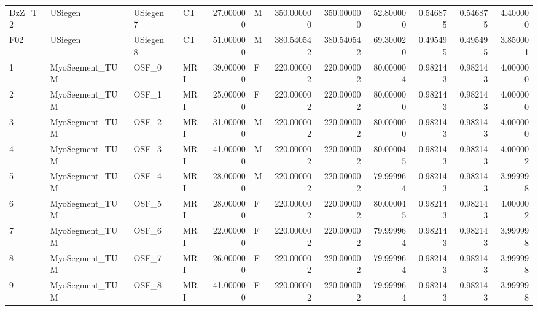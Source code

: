 \begin{tabular}{llllrlrrrrrr}
DzZ\_T2 &         USiegen &    USiegen\_7 &                 CT &  27.000000 &        M &       350.000000 &    350.000000 &   52.800000 &               0.546875 &            0.546875 &          4.400000 \\
F02    &         USiegen &    USiegen\_8 &                 CT &  51.000000 &        M &       380.540542 &    380.540542 &   69.300020 &               0.495495 &            0.495495 &          3.850001 \\
1      &  MyoSegment\_TUM &        OSF\_0 &                MRI &  39.000000 &        F &       220.000002 &    220.000002 &   80.000004 &               0.982143 &            0.982143 &          4.000000 \\
2      &  MyoSegment\_TUM &        OSF\_1 &                MRI &  25.000000 &        F &       220.000002 &    220.000002 &   80.000000 &               0.982143 &            0.982143 &          4.000000 \\
3      &  MyoSegment\_TUM &        OSF\_2 &                MRI &  31.000000 &        M &       220.000002 &    220.000002 &   80.000000 &               0.982143 &            0.982143 &          4.000000 \\
4      &  MyoSegment\_TUM &        OSF\_3 &                MRI &  41.000000 &        M &       220.000002 &    220.000002 &   80.000045 &               0.982143 &            0.982143 &          4.000002 \\
5      &  MyoSegment\_TUM &        OSF\_4 &                MRI &  28.000000 &        M &       220.000002 &    220.000002 &   79.999964 &               0.982143 &            0.982143 &          3.999998 \\
6      &  MyoSegment\_TUM &        OSF\_5 &                MRI &  28.000000 &        F &       220.000002 &    220.000002 &   80.000045 &               0.982143 &            0.982143 &          4.000002 \\
7      &  MyoSegment\_TUM &        OSF\_6 &                MRI &  22.000000 &        F &       220.000002 &    220.000002 &   79.999964 &               0.982143 &            0.982143 &          3.999998 \\
8      &  MyoSegment\_TUM &        OSF\_7 &                MRI &  26.000000 &        F &       220.000002 &    220.000002 &   79.999964 &               0.982143 &            0.982143 &          3.999998 \\
9      &  MyoSegment\_TUM &        OSF\_8 &                MRI &  41.000000 &        F &       220.000002 &    220.000002 &   79.999964 &               0.982143 &            0.982143 &          3.999998 \\

\end{tabular}
